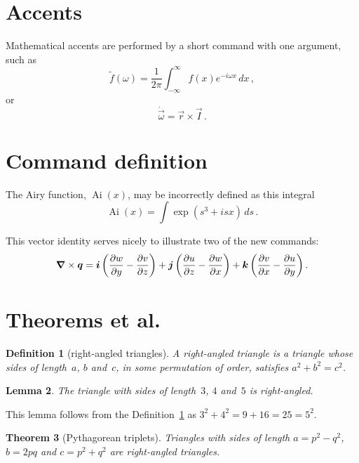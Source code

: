 \documentclass[11pt,a4paper,oldfontcommands]{memoir}
\begin{document}
\section{Accents}

Mathematical accents are performed by a short command with one 
argument, such as
\[
  \tilde f(\omega)=\frac{1}{2\pi}
  \int_{-\infty}^\infty f(x)e^{-i\omega x}\,dx\,,
\]
or
\[
  \dot{\vec \omega}=\vec r\times\vec I\,.
\]





\section{Command definition}

\newcommand{\Ai}{\operatorname{Ai}} 
The Airy function, $\Ai(x)$, may be incorrectly defined as this 
integral
\[
  \Ai(x)=\int\exp(s^3+isx)\,ds\,.
\]

\newcommand{\D}[2]{\frac{\partial #2}{\partial #1}}
\newcommand{\DD}[2]{\frac{\partial^2 #2}{\partial #1^2}}
\renewcommand{\vec}[1]{\text{\boldmath$#1$}}

This vector identity serves nicely to illustrate two of the new 
commands:
\[
  \vec\nabla\times\vec q
  =\vec i\left(\D yw-\D zv\right)
  +\vec j\left(\D zu-\D xw\right)
  +\vec k\left(\D xv-\D yu\right).
\]




\section{Theorems et al.}

\newtheorem{theorem}{Theorem}
\newtheorem{corollary}[theorem]{Corollary}
\newtheorem{lemma}[theorem]{Lemma}
\newtheorem{definition}[theorem]{Definition}

\begin{definition}[right-angled triangles] \label{def:tri}
A \emph{right-angled triangle} is a triangle whose sides of length~\(a\), \(b\) and~\(c\), in some permutation of order, satisfies \(a^2+b^2=c^2\).
\end{definition}

\begin{lemma} 
The triangle with sides of length~\(3\), \(4\) and~\(5\) is right-angled.
\end{lemma}

This lemma follows from the Definition~\ref{def:tri} as \(3^2+4^2=9+16=25=5^2\).

\begin{theorem}[Pythagorean triplets] \label{thm:py}
Triangles with sides of length \(a=p^2-q^2\), \(b=2pq\) and \(c=p^2+q^2\) are right-angled triangles.
\end{theorem}
\end{document}
